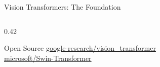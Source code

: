 \documentclass[aspectratio=169,xcolor=dvipsnames]{beamer}
\begin{document}
\begin{frame}{Vision Transformers: The Foundation}
\begin{columns}
\begin{column}{0.42\textwidth}
            \vspace{0.2em}
            
            \begin{exampleblock}{ Open Source}
                \scriptsize
                \href{https://github.com/google-research/vision_transformer}{google-research/vision\_transformer}\\
                \href{https://github.com/microsoft/Swin-Transformer}{microsoft/Swin-Transformer}
            \end{exampleblock}
        \end{column}
    \end{columns}
\end{frame}

\end{document}
